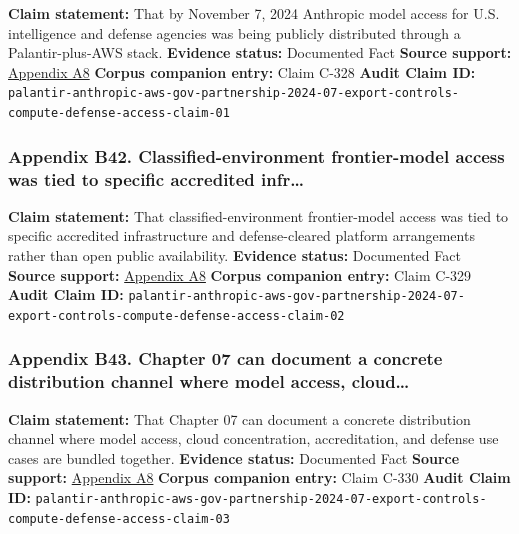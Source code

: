 \documentclass[
  american,
  11pt,
  letterpaper,
]{article}
\begin{document}
\textbf{Claim statement:} That by November 7, 2024 Anthropic model
access for U.S. intelligence and defense agencies was being publicly
distributed through a Palantir-plus-AWS stack. \textbf{Evidence status:}
Documented Fact \textbf{Source support:}
\hyperref[appendix-a8-anthropic-and-palantir-partner-to-bring-claude-ai-models-to-aws-for-u-s-government-intelligence-and-defense-operations]{Appendix
A8} \textbf{Corpus companion entry:} Claim C-328 \textbf{Audit Claim
ID:}
\texttt{palantir-anthropic-aws-gov-partnership-2024-07-export-controls-compute-defense-access-claim-01}

\subsubsection{Appendix B42. Classified-environment frontier-model
access was tied to specific accredited
infr\ldots{}}\label{appendix-b42-classified-environment-frontier-model-access-was-tied-to-specific-accredited-infr}

\textbf{Claim statement:} That classified-environment frontier-model
access was tied to specific accredited infrastructure and
defense-cleared platform arrangements rather than open public
availability. \textbf{Evidence status:} Documented Fact \textbf{Source
support:}
\hyperref[appendix-a8-anthropic-and-palantir-partner-to-bring-claude-ai-models-to-aws-for-u-s-government-intelligence-and-defense-operations]{Appendix
A8} \textbf{Corpus companion entry:} Claim C-329 \textbf{Audit Claim
ID:}
\texttt{palantir-anthropic-aws-gov-partnership-2024-07-export-controls-compute-defense-access-claim-02}

\subsubsection{Appendix B43. Chapter 07 can document a concrete
distribution channel where model access,
cloud\ldots{}}\label{appendix-b43-chapter-07-can-document-a-concrete-distribution-channel-where-model-access-cloud}

\textbf{Claim statement:} That Chapter 07 can document a concrete
distribution channel where model access, cloud concentration,
accreditation, and defense use cases are bundled together.
\textbf{Evidence status:} Documented Fact \textbf{Source support:}
\hyperref[appendix-a8-anthropic-and-palantir-partner-to-bring-claude-ai-models-to-aws-for-u-s-government-intelligence-and-defense-operations]{Appendix
A8} \textbf{Corpus companion entry:} Claim C-330 \textbf{Audit Claim
ID:}
\texttt{palantir-anthropic-aws-gov-partnership-2024-07-export-controls-compute-defense-access-claim-03}
\end{document}
